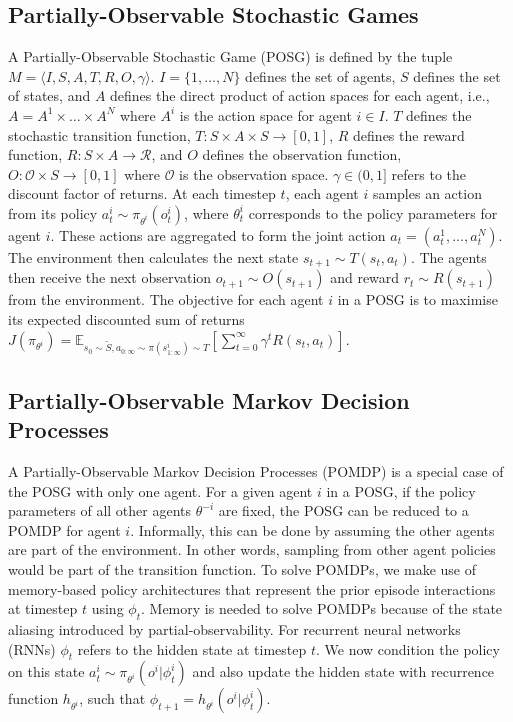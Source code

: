 \documentclass{article}
\begin{document}
\subsection{Partially-Observable Stochastic Games}
\label{subsec:posg}
 A Partially-Observable Stochastic Game (POSG) \citep{kuhn53} is defined by the tuple $M = \langle I, S, A, T, R, O, \gamma \rangle$. $I = \{ 1, \dots, N \}$ defines the set of agents, $S$ defines the set of states, and $A$ defines the direct product of action spaces for each agent, i.e., $A = A^1 \times \dots \times A^N$ where $A^i$ is the action space for agent $i \in I$. $T$ defines the stochastic transition function, $T: S \times A \times S \to [0, 1]$, $R$ defines the reward function, $R: S \times A \to \mathcal{R}$, and $O$ defines the observation function, $O: \mathcal{O} \times S \to [0, 1]$ where $\mathcal{O}$ is the observation space. $\gamma \in (0, 1]$ refers to the discount factor of returns.
At each timestep $t$, each agent $i$ samples an action from its policy $a^i_t \sim \pi_{\theta^i}(o^i_t)$, where $\theta^i_t$ corresponds to the policy parameters for agent $i$. These actions are aggregated to form the joint action $a_t = (a^1_t, \dots, a^N_t)$. The environment then calculates the next state $s_{t+1} \sim T(s_t, a_t)$. The agents then receive the next observation $o_{t+1} \sim O(s_{t+1})$ and reward $r_t \sim R(s_{t+1})$ from the environment. The objective for each agent $i$ in a POSG is to maximise its expected discounted sum of returns $J(\pi_{\theta^i}) = \mathbb{E}_{s_0 \sim \tilde{S}, a_{0:\infty} \sim \pi( s^i_{1:\infty}) \sim T} \left [ \sum_{t=0}^\infty \gamma^t R(s_t, a_t) \right ]$.
\subsection{Partially-Observable Markov Decision Processes}
\label{subsec:pomdp}
A Partially-Observable Markov Decision Processes (POMDP) \citep{kaelbling98} is a special case of the POSG with only one agent. For a given agent $i$ in a POSG, if the policy parameters of all other agents $\theta^{-i}$ are fixed, the POSG can be reduced to a POMDP for agent $i$. Informally, this can be done by assuming the other agents are part of the environment. In other words, sampling from other agent policies would be part of the transition function.
To solve POMDPs, we make use of memory-based policy architectures that represent the prior episode interactions at timestep $t$ using $\phi_t$. Memory is needed to solve POMDPs because of the state aliasing introduced by partial-observability. For recurrent neural networks (RNNs) $\phi_t$ refers to the hidden state at timestep $t$.
We now condition the policy on this state $a^i_t \sim \pi_{\theta^i}(o^i | \phi^i_t)$ and also update the hidden state with recurrence function $h_{\theta^i}$, such that $\phi_{t+1} = h_{\theta^i}(o^i | \phi^i_t)$.
\end{document}
